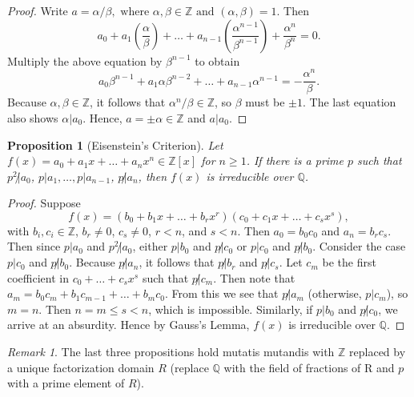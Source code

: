 \documentclass[draft]{article}
\newtheorem{prop}[thm]{Proposition}
\theoremstyle{definition}
\theoremstyle{remark}
\newtheorem{rem}{Remark}[section]
\begin{document}
			\begin{proof}
				Write $a = \alpha / \beta, \text{ where } \alpha, \beta \in \mathbb{Z} \text{ and } (\alpha, \beta) = 1$. Then
				\begin{equation*}
					a_0 + a_1(\frac{\alpha}{\beta}) + \dots + a_{n - 1}(\frac{\alpha^{n - 1}}{\beta^{n - 1}}) + \frac{\alpha^n}{\beta^n} = 0.
				\end{equation*}
				Multiply the above equation by $\beta^{n - 1}$ to obtain
				\begin{equation*}
					a_0\beta^{n - 1} + a_1\alpha\beta^{n - 2} + \dots + a_{n - 1}\alpha^{n - 1} = -\frac{\alpha^n}{\beta}.
				\end{equation*}
				Because $\alpha, \beta \in \mathbb{Z}$, it follows that $\alpha^n / \beta \in \mathbb{Z}$, so $\beta$ must be $\pm 1$. The last equation also shows $\alpha | a_0$. Hence, $a = \pm \alpha \in \mathbb{Z}$ and $a | a_0$.
			\end{proof}
			
			\begin{prop}[Eisenstein's Criterion]
				Let $f(x) = a_0 + a_1x + \dots + a_{n}x^n \in \mathbb{Z}[x]$ for $n \geq 1$. If there is a prime $p$ such that $p^2 \not| a_0$, $p | a_1, \dots, p | a_{n - 1}$, $p \not| a_n$, then $f(x)$ is irreducible over $\mathbb{Q}$.
			\end{prop}
			
			\begin{proof}
				Suppose\begin{equation*}
					f(x) = (b_0 + b_1x + \dots + b_rx^r)(c_0 + c_1x + \dots + c_sx^s),
				\end{equation*}
				with $b_i, c_i \in \mathbb{Z}$, $b_r \neq 0$, $c_s \neq 0$, $r < n$, and $s < n$. Then $a_0 = b_0c_0$ and $a_n = b_rc_s$. Then since $p | a_0$ and $p^2 \not| a_0$, either $p | b_0$ and $p \not| c_0$ or $p | c_0$ and $p \not| b_0$. Consider the case $p | c_0$ and $p \not| b_0$. Because $p \not| a_n$, it follows that $p \not| b_r$ and $p \not| c_s$. Let $c_m$ be the first coefficient in $c_0 + \dots + c_sx^s$ such that $p \not| c_m$. Then note that $a_m = b_0c_m + b_1c_{m - 1} + \dots + b_mc_0$. From this we see that $p \not| a_m$ (otherwise, $p | c_m$), so $m = n$. Then $n = m \leq s < n$, which is impossible. Similarly, if $p | b_0$ and $p \not| c_0$, we arrive at an absurdity. Hence by Gauss's Lemma, $f(x)$ is irreducible over $\mathbb{Q}$.
			\end{proof}
			
			\begin{rem}
			    The last three propositions hold mutatis mutandis with $\mathbb{Z}$ replaced by a unique factorization domain $R$ (replace $\mathbb{Q}$ with the field of fractions of R and $p$ with a prime element of $R$).
			\end{rem}
			
\end{document}

